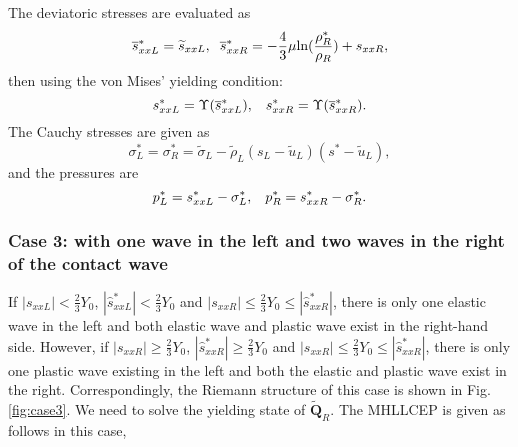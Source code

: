 \documentclass[review]{elsarticle}
\begin{document}
The deviatoric stresses are evaluated as
\begin{equation}
  \overline{s}_{xxL}^*= \widetilde{s}_{xxL},\hspace{0.2cm}  \overline{s}_{xxR}^*=-\frac{4}{3}\mu\text{ln}(\frac{\rho_R^*}{\rho_R})+s_{xxR},
\end{equation}
then using  the von Mises' yielding condition:
\begin{equation}
  s_{xxL}^* = \Upsilon(\overline{s}_{xxL}^*), \hspace{0.3cm}  s_{xxR}^* = \Upsilon(\overline{s}_{xxR}^*).
\end{equation}
The Cauchy stresses are given as
\begin{equation}
  \sigma_L^*=\sigma_R^*=\widetilde{\sigma}_L -\widetilde{\rho}_L (s_L-\widetilde{u}_L)(s^*-\widetilde{u}_L),
\end{equation}
and the pressures are
\begin{equation}
  p_L^* = s_{xxL}^* - \sigma_L^*, \hspace{0.3cm}   p_R^* = s_{xxR}^* - \sigma_R^*.
\end{equation}
\subsubsection {Case 3: with one wave in the left and two  waves in the right of the contact wave}\label{sec:case3}
If  $|s_{xxL}|<\frac{2}{3}Y_0$, $|\hat{s}_{xxL}^*| < \frac{2}{3}Y_0$  and $|s_{xxR}| \le \frac{2}{3}Y_0 \le  |\hat{s}_{xxR}^*|$, there is only one elastic wave in the left and both elastic wave and plastic wave exist in the right-hand side. However, if  $|s_{xxR}|\geq \frac{2}{3}Y_0$, $|\hat{s}_{xxR}^*| \geq \frac{2}{3}Y_0$  and $|s_{xxR}| \le \frac{2}{3}Y_0 \le  |\hat{s}_{xxR}^*|$,  there is only one plastic wave existing in the left and both the elastic and plastic wave exist in the right. Correspondingly, the Riemann structure of this case is shown in Fig.\ref{fig:case3}. We need to solve the yielding state of $\widetilde{\mathbf{Q}}_R$. The MHLLCEP is given as follows in this case,

\end{document}
